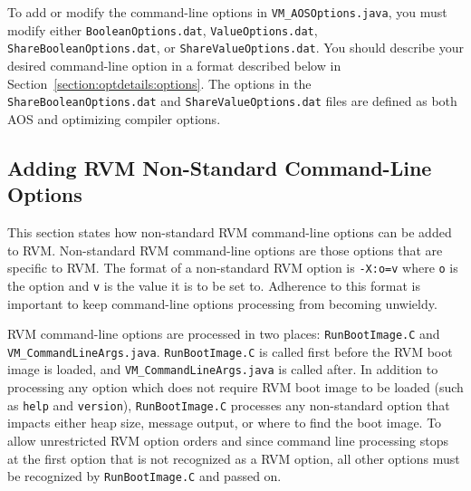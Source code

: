 To add or modify the command-line options in {\tt VM\_AOSOptions.java},
you must modify either {\tt BooleanOptions.dat}, {\tt ValueOptions.dat},
{\tt ShareBooleanOptions.dat}, or {\tt ShareValueOptions.dat}.
You should describe your desired command-line option in a format 
described below in Section~\ref{section:optdetails:options}.
The options in the {\tt ShareBooleanOptions.dat} and {\tt ShareValueOptions.dat}
files are defined as both AOS and optimizing compiler options.

\subsection{Adding RVM Non-Standard Command-Line Options}

This section states how non-standard RVM command-line options can be added
to RVM.  
Non-standard RVM command-line options are those options that are specific to RVM.
The format of a non-standard RVM option is {\tt -X:o=v} where {\tt o} is the 
option and {\tt v} is the value it is to be set to.
Adherence to this format is important to keep command-line options processing
from becoming unwieldy.

RVM command-line options are processed in two places: {\tt RunBootImage.C} and
{\tt VM\_CommandLineArgs.java}.  
{\tt RunBootImage.C} is called first before the RVM boot image is loaded,
and {\tt VM\_CommandLineArgs.java} is called after.
In addition to processing any option which does not require RVM boot image
to be loaded (such as {\tt help} and {\tt version}), 
{\tt RunBootImage.C} processes any non-standard option that impacts either 
heap size, message output, or where to find the boot image.
To allow unrestricted RVM option orders and 
since command line processing stops at the first option that is not 
recognized as a RVM option, all other options must be recognized by
{\tt RunBootImage.C} and passed on.
